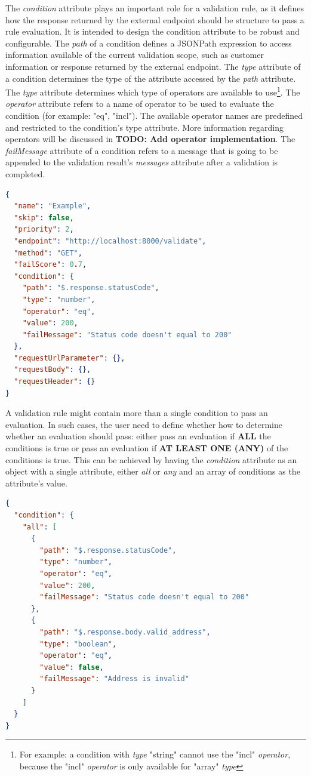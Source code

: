 The \emph{condition} attribute plays an important role for a validation rule, as it defines how the response returned by the external endpoint should be structure to pass a rule evaluation. It is intended to design the condition attribute to be robust and configurable. The \emph{path} of a condition defines a JSONPath\autocite{Friesen2019} expression to access information available of the current validation scope, such as customer information or response returned by the external endpoint. The \emph{type} attribute of a condition determines the type of the attribute accessed by the \emph{path} attribute. The \emph{type} attribute determines which type of operators are available to use\footnote{For example: a condition with \emph{type} "string" cannot use the "incl" \emph{operator}, because the "incl" \emph{operator} is only available for "array" \emph{type}}. The \emph{operator} attribute refers to a name of operator to be used to evaluate the condition (for example: "eq", "incl"). The available operator names are predefined and restricted to the condition's type attribute. More information regarding operators will be discussed in \textbf{TODO: Add operator implementation}. The \emph{failMessage} attribute of a condition refers to a message that is going to be appended to the validation result's \emph{messages} attribute after a validation is completed.

\begin{lstlisting}[caption={Validation rule example (JSON)}, language=json]
{
  "name": "Example",
  "skip": false,
  "priority": 2,
  "endpoint": "http://localhost:8000/validate",
  "method": "GET",
  "failScore": 0.7,
  "condition": {
    "path": "$.response.statusCode",
    "type": "number",
    "operator": "eq",
    "value": 200,
    "failMessage": "Status code doesn't equal to 200"
  },
  "requestUrlParameter": {},
  "requestBody": {},
  "requestHeader": {}
}
\end{lstlisting}

A validation rule might contain more than a single condition to pass an evaluation. In such cases, the user need to define whether how to determine whether an evaluation should pass: either pass an evaluation if \textbf{ALL} the conditions is true or pass an evaluation if \textbf{AT LEAST ONE (ANY)} of the conditions is true. This can be achieved by having the \emph{condition} attribute as an object with a single attribute, either \emph{all} or \emph{any} and an array of conditions as the attribute's value.

\begin{lstlisting}[caption={Validation rule \textbf{condition} attribute example with ALL condition (JSON)}, language=json]
{
  "condition": {
    "all": [
      {
        "path": "$.response.statusCode",
        "type": "number",
        "operator": "eq",
        "value": 200,
        "failMessage": "Status code doesn't equal to 200"
      },
      {
        "path": "$.response.body.valid_address",
        "type": "boolean",
        "operator": "eq",
        "value": false,
        "failMessage": "Address is invalid"
      }
    ]
  }
}
\end{lstlisting}

